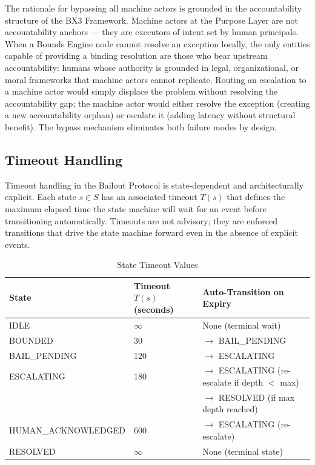 The rationale for bypassing all machine actors is grounded in the accountability structure of the BX3 Framework. Machine actors at the Purpose Layer are not accountability anchors --- they are executors of intent set by human principals. When a Bounds Engine node cannot resolve an exception locally, the only entities capable of providing a binding resolution are those who bear upstream accountability: humans whose authority is grounded in legal, organizational, or moral frameworks that machine actors cannot replicate. Routing an escalation to a machine actor would simply displace the problem without resolving the accountability gap; the machine actor would either resolve the exception (creating a new accountability orphan) or escalate it (adding latency without structural benefit). The bypass mechanism eliminates both failure modes by design.

\subsection{Timeout Handling}

Timeout handling in the Bailout Protocol is state-dependent and architecturally explicit. Each state $s \in S$ has an associated timeout $T(s)$ that defines the maximum elapsed time the state machine will wait for an event before transitioning automatically. Timeouts are not advisory; they are enforced transitions that drive the state machine forward even in the absence of explicit events.

\begin{table}[htbp]
\caption{State Timeout Values}
\label{tab:timeouts}
\centering
\begin{tabular}{lll}
\toprule
State & Timeout $T(s)$ (seconds) & Auto-Transition on Expiry \\
\midrule
IDLE & $\infty$ & None (terminal wait) \\
BOUNDED & 30 & $\rightarrow$ BAIL\_PENDING \\
BAIL\_PENDING & 120 & $\rightarrow$ ESCALATING \\
ESCALATING & 180 & $\rightarrow$ ESCALATING (re-escalate if depth $<$ max) \\
 & & $\rightarrow$ RESOLVED (if max depth reached) \\
HUMAN\_ACKNOWLEDGED & 600 & $\rightarrow$ ESCALATING (re-escalate) \\
RESOLVED & $\infty$ & None (terminal state) \\
\bottomrule
\end{tabular}
\end{table}

